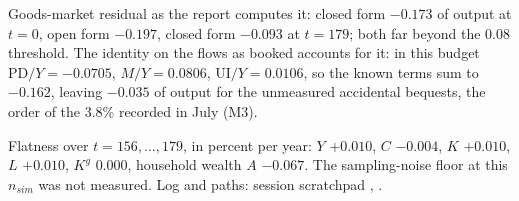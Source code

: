 Goods-market residual as the report computes it: closed form $-0.173$ of output at $t = 0$, open form $-0.197$, closed form $-0.093$ at $t = 179$; both far beyond the 0.08 threshold. The identity on the flows as booked accounts for it: in this budget $\mathrm{PD}/Y = -0.0705$, $M/Y = 0.0806$, $\mathrm{UI}/Y = 0.0106$, so the known terms sum to $-0.162$, leaving $-0.035$ of output for the unmeasured accidental bequests, the order of the 3.8\% recorded in July (M3).

Flatness over $t = 156, \dots, 179$, in percent per year: $Y$ $+0.010$, $C$ $-0.004$, $K$ $+0.010$, $L$ $+0.010$, $K^g$ $0.000$, household wealth $A$ $-0.067$. The sampling-noise floor at this $n_{sim}$ was not measured. Log and paths: session scratchpad , .
